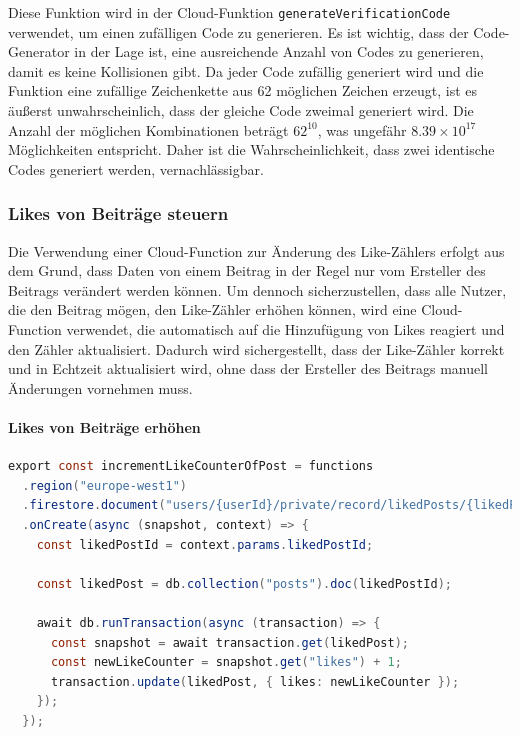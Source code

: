 Diese Funktion wird in der Cloud-Funktion \texttt{generateVerificationCode} verwendet, um einen zufälligen Code zu generieren. Es ist wichtig, dass der Code-Generator in der Lage ist, eine ausreichende Anzahl von Codes zu generieren, damit es keine Kollisionen gibt. Da jeder Code zufällig generiert wird und die Funktion eine zufällige Zeichenkette aus 62 möglichen Zeichen erzeugt, ist es äußerst unwahrscheinlich, dass der gleiche Code zweimal generiert wird. Die Anzahl der möglichen Kombinationen beträgt $62^{10}$, was ungefähr $8.39 \times 10^{17}$ Möglichkeiten entspricht. Daher ist die Wahrscheinlichkeit, dass zwei identische Codes generiert werden, vernachlässigbar.

\subsubsection{Likes von Beiträge steuern}

Die Verwendung einer Cloud-Function zur Änderung des Like-Zählers erfolgt aus dem Grund, dass Daten von einem Beitrag in der Regel nur vom Ersteller des Beitrags verändert werden können. Um dennoch sicherzustellen, dass alle Nutzer, die den Beitrag mögen, den Like-Zähler erhöhen können, wird eine Cloud-Function verwendet, die automatisch auf die Hinzufügung von Likes reagiert und den Zähler aktualisiert. Dadurch wird sichergestellt, dass der Like-Zähler korrekt und in Echtzeit aktualisiert wird, ohne dass der Ersteller des Beitrags manuell Änderungen vornehmen muss.

\paragraph{Likes von Beiträge erhöhen}

\begin{lstlisting}[language=Java,caption=incrementLikeCounterOfPost Funktion,label=lst:incrementLikePostFunction]
  export const incrementLikeCounterOfPost = functions
  .region("europe-west1")
  .firestore.document("users/{userId}/private/record/likedPosts/{likedPostId}")
  .onCreate(async (snapshot, context) => {
    const likedPostId = context.params.likedPostId;

    const likedPost = db.collection("posts").doc(likedPostId);

    await db.runTransaction(async (transaction) => {
      const snapshot = await transaction.get(likedPost);
      const newLikeCounter = snapshot.get("likes") + 1;
      transaction.update(likedPost, { likes: newLikeCounter });
    });
  });
\end{lstlisting}

